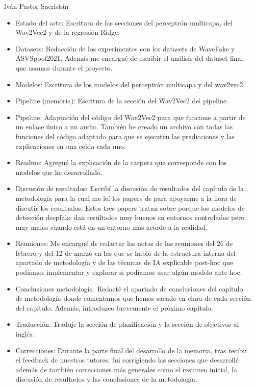 \begin{contribucion}{Iván Pastor Sacristán}
\begin{itemize}
	\item Estado del arte: Escritura de las secciones del perceptrón multicapa, del Wav2Vec2 y de la regresión Ridge.
	
	\item Datasets: Redacción de los experimentos con los datasets de WaveFake y ASVSpoof2021. Además me encargué de escribir el análisis del dataset final que usamos durante el proyecto. 
	
	\item Modelos: Escritura de los modelos del perceptrón multicapa y del wav2vec2.
	
	\item Pipeline (memoria): Escritura de la sección del Wav2Vec2 del pipeline.
	
	\item Pipeline: Adaptación del código del Wav2Vec2 para que funcione a partir de un enlace único a un audio. También he creado un archivo con todas las funciones del código adaptado para que se ejecuten las predicciones y las explicaciones en una celda cada uno.
	
	\item Readme: Agregué la explicación de la carpeta que corresponde con los modelos que he desarrollado.
	
	\item Discusión de resultados: Escribí la discusión de resultados del capítulo de la metodología para la cual me leí los papers de \cite{firc2025deepfake,p2v2025,crossdomain2024} para apoyarme a la hora de discutir los resultados. Estos tres papers tratan sobre porque los modelos de detección deepfake dan resultados muy buenos en entornos controlados pero muy malos cuando está en un entorno más acorde a la realidad.
	
	\item Reuniones: Me encargué de redactar las notas de las reuniones del 26 de febrero y del 12 de marzo en las que se habló de la estructura interna del apartado de metodología y de las técnicas de IA explicable post-hoc que podíamos implementar y explorar si podíamos usar algún modelo ante-hoc.
	
	\item Conclusiones metodología: Redacté el apartado de conclusiones del capítulo de metodología donde comentamos que hemos sacado en claro de cada sección del capítulo. Además, introduzco brevemente el próximo capítulo.
	
	\item Traducción: Traduje la sección de planificación y la sección de objetivos al inglés.
	
	\item Correcciones: Durante la parte final del desarrollo de la memoria, tras recibir el feedback de nuestros tutores, fui corrigiendo las secciones que desarrollé además de también correcciones más generales como el resumen inicial, la discusión de resultados y las conclusiones de la metodología.
\end{itemize}
\end{contribucion}
